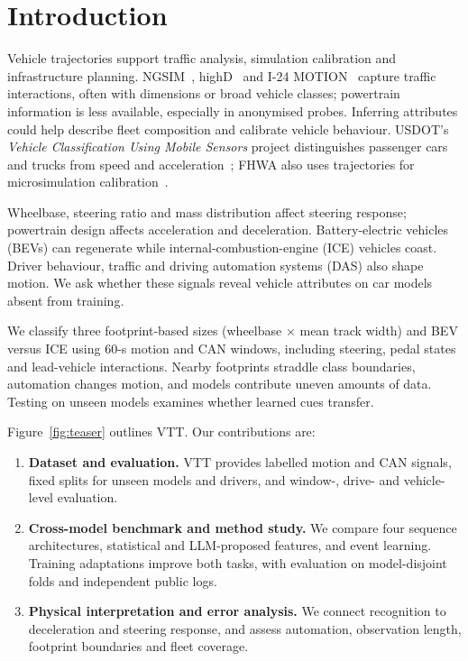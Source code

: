 \section{Introduction}\label{sec:intro}

Vehicle trajectories support traffic analysis, simulation calibration and infrastructure planning. NGSIM~\cite{fhwa2016ngsim}, highD~\cite{krajewski2018highd} and I-24 MOTION~\cite{gloudemans2023motion} capture traffic interactions, often with dimensions or broad vehicle classes; powertrain information is less available, especially in anonymised probes. Inferring attributes could help describe fleet composition and calibrate vehicle behaviour. USDOT's \emph{Vehicle Classification Using Mobile Sensors} project distinguishes passenger cars and trucks from speed and acceleration~\cite{ban2013mobile}; FHWA also uses trajectories for microsimulation calibration~\cite{hale2021calibration}.

Wheelbase, steering ratio and mass distribution affect steering response; powertrain design affects acceleration and deceleration. Battery-electric vehicles (BEVs) can regenerate while internal-combustion-engine (ICE) vehicles coast. Driver behaviour, traffic and driving automation systems (DAS) also shape motion. We ask whether these signals reveal vehicle attributes on car models absent from training.

We classify three footprint-based sizes (wheelbase $\times$ mean track width) and BEV versus ICE using 60-s motion and CAN windows, including steering, pedal states and lead-vehicle interactions. Nearby footprints straddle class boundaries, automation changes motion, and models contribute uneven amounts of data. Testing on unseen models examines whether learned cues transfer.

Figure~\ref{fig:teaser} outlines VTT. Our contributions are:
\begin{enumerate}[label=(\arabic*)]
\item \textbf{Dataset and evaluation.} VTT provides labelled motion and CAN signals, fixed splits for unseen models and drivers, and window-, drive- and vehicle-level evaluation.
\item \textbf{Cross-model benchmark and method study.} We compare four sequence architectures, statistical and LLM-proposed features, and event learning. Training adaptations improve both tasks, with evaluation on model-disjoint folds and independent public logs.
\item \textbf{Physical interpretation and error analysis.} We connect recognition to deceleration and steering response, and assess automation, observation length, footprint boundaries and fleet coverage.
\end{enumerate}
